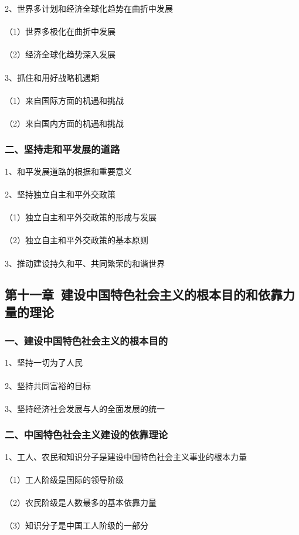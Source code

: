 \documentclass{ctexart}
\begin{document}
2、世界多计划和经济全球化趋势在曲折中发展
\\\\
（1）世界多极化在曲折中发展
\\\\
（2）经济全球化趋势深入发展
\\\\

3、抓住和用好战略机遇期
\\\\
（1）来自国际方面的机遇和挑战
\\\\
（2）来自国内方面的机遇和挑战
\subsubsection{二、坚持走和平发展的道路}
1、和平发展道路的根据和重要意义
\\\\

2、坚持独立自主和平外交政策
\\\\
（1）独立自主和平外交政策的形成与发展
\\\\
（2）独立自主和平外交政策的基本原则
\\\\

3、推动建设持久和平、共同繁荣的和谐世界


\subsection{第十一章\ 建设中国特色社会主义的根本目的和依靠力量的理论}
\subsubsection{一、建设中国特色社会主义的根本目的}
1、坚持一切为了人民
\\\\

2、坚持共同富裕的目标
\\\\

3、坚持经济社会发展与人的全面发展的统一

\subsubsection{二、中国特色社会主义建设的依靠理论}
1、工人、农民和知识分子是建设中国特色社会主义事业的根本力量
\\\\
（1）工人阶级是国际的领导阶级
\\\\
（2）农民阶级是人数最多的基本依靠力量
\\\\
（3）知识分子是中国工人阶级的一部分
\\\\
\end{document}

